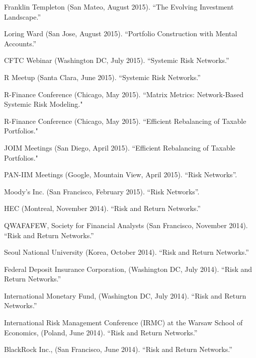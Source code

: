 \documentclass{article}
\begin{document}
\begin{etaremune}
{\item Franklin Templeton (San Mateo, August 2015). ``The Evolving Investment Landscape.''

\item Loring Ward (San Jose, August 2015). ``Portfolio Construction with Mental Accounts.''

\item CFTC Webinar (Washington DC, July 2015). ``Systemic Risk Networks.''

\item R Meetup (Santa Clara, June 2015). ``Systemic Risk Networks.''

\item R-Finance Conference (Chicago, May 2015). ``Matrix Metrics: Network-Based Systemic Risk Modeling."

\item R-Finance Conference (Chicago, May 2015). ``Efficient Rebalancing of Taxable Portfolios."

\item JOIM Meetings (San Diego, April 2015). ``Efficient Rebalancing of Taxable Portfolios."

\item PAN-IIM Meetings  (Google, Mountain View, April 2015). ``Risk Networks''.

\item Moody's Inc.  (San Francisco, February 2015). ``Risk Networks''.

\item HEC (Montreal, November 2014). ``Risk and Return Networks.''

\item QWAFAFEW, Society for Financial Analysts (San Francisco, November 2014). ``Risk and Return Networks.''

\item Seoul National University (Korea, October 2014). ``Risk and Return Networks.''

\item Federal Deposit Insurance Corporation, (Washington DC, July 2014). ``Risk and Return Networks.''

\item International Monetary Fund, (Washington DC, July 2014). ``Risk and Return Networks.''

\item International Risk Management Conference (IRMC) at the Warsaw School of Economics, (Poland, June 2014). ``Risk and Return Networks.''

\item BlackRock Inc., (San Francisco, June 2014). ``Risk and Return Networks.''

}
\end{etaremune}
\end{document}
